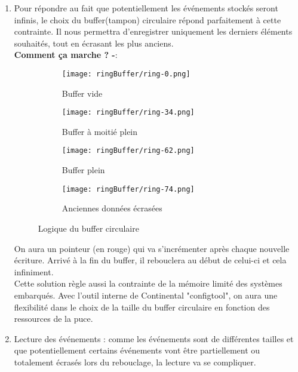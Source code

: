 \documentclass[a4paper, 12pt]{report}
\begin{document}
\begin{enumerate}
    \item Pour répondre au fait que potentiellement les événements stockés seront infinis, le choix du buffer(tampon) circulaire répond parfaitement à cette contrainte. Il nous permettra d'enregistrer uniquement les derniers éléments souhaités, tout en écrasant les plus anciens.\\
    \textbf{Comment ça marche ? -}:
            \begin{figure}[H]
             \centering
             \begin{subfigure}[t]{0.45\textwidth}
                 \centering
                 \texttt{[image: ringBuffer/ring-0.png]}
                 \caption{Buffer vide}
                 \label{filtre8}
             \end{subfigure}
             \hfill
             \begin{subfigure}[t]{0.45\textwidth}
             \centering
             \texttt{[image: ringBuffer/ring-34.png]}
             \caption{Buffer à moitié plein}
            \label{filtre7}
             \end{subfigure}
             \hfill 
            \begin{subfigure}[t]{0.45\textwidth}
                 \centering
                 \texttt{[image: ringBuffer/ring-62.png]}
                 \caption{Buffer plein}
                 \label{filtre6}
             \end{subfigure}
             \hfill
             \begin{subfigure}[t]{0.45\textwidth}
                 \centering
                 \texttt{[image: ringBuffer/ring-74.png]}
                 \caption{Anciennes données écrasées}
                 \label{filtre6}
             \end{subfigure}
             \hfill
             \centering
             \caption{Logique du buffer circulaire\cite{wikipedia_circular_buffer}}
                \label{filtres}
            \end{figure}

            On aura un pointeur (en rouge) qui va s'incrémenter après chaque nouvelle écriture. Arrivé à la fin du buffer, il rebouclera  au début de celui-ci et cela infiniment.\\
            Cette solution règle aussi la contrainte de la  mémoire limité des systèmes embarqués. Avec l'outil interne de Continental "configtool", on aura une flexibilité dans le choix de la taille du buffer circulaire en fonction des ressources de la puce.
    \item Lecture des événements : comme les événements sont de différentes tailles et que potentiellement certains événements vont être partiellement ou totalement écrasés lors du rebouclage, la lecture va se compliquer.\\
    

\end{enumerate}
\end{document}
